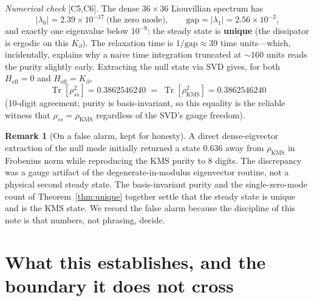 \documentclass[11pt,a4paper]{article}
\theoremstyle{plain}
\theoremstyle{definition}
\newtheorem{remark}{Remark}
\newcommand{\Kp}{K_{\partial}}
\newcommand{\rhoKMS}{\rho_{\mathrm{KMS}}}
\newcommand{\Tr}{\operatorname{Tr}}
\newcommand{\Heff}{H_{\mathrm{eff}}}
\newcommand{\status}[1]{{\small\textsf{[#1]}}}
\begin{document}
\noindent\emph{Numerical check} \status{C5,C6}. The dense $36\times36$
Liouvillian spectrum has
\[
  \lvert\lambda_0\rvert = 2.39\times10^{-17}\ \text{(the zero mode)},
  \qquad
  \text{gap} = \lvert\lambda_1\rvert = 2.56\times10^{-2},
\]
and exactly one eigenvalue below $10^{-9}$: the steady state is \textbf{unique}
(the dissipator is ergodic on this $\Kp$). The relaxation time is
$1/\text{gap}\approx 39$ time units---which, incidentally, explains why a naive
time integration truncated at $\sim160$ units reads the purity slightly early.
Extracting the null state via SVD gives, for both $\Heff=0$ and $\Heff=\Kp$,
\[
  \Tr[\rho_{ss}^2] = 0.3862546240
  \;=\;
  \Tr[\rhoKMS^2] = 0.3862546240
\]
(10-digit agreement; purity is basis-invariant, so this equality is the reliable
witness that $\rho_{ss}=\rhoKMS$ regardless of the SVD's gauge freedom).

\begin{remark}[On a false alarm, kept for honesty]
A direct dense-eigvector extraction of the null mode initially returned a state
$0.636$ away from $\rhoKMS$ in Frobenius norm while reproducing the KMS purity to
8 digits. The discrepancy was a gauge artifact of the degenerate-in-modulus
eigenvector routine, not a physical second steady state. The basis-invariant
purity and the single-zero-mode count of Theorem~\ref{thm:unique} together
settle that the steady state is unique and is the KMS state. We record the false
alarm because the discipline of this note is that numbers, not phrasing, decide.
\end{remark}

\section{What this establishes, and the boundary it does not cross}
\label{sec:boundary}
\end{document}
